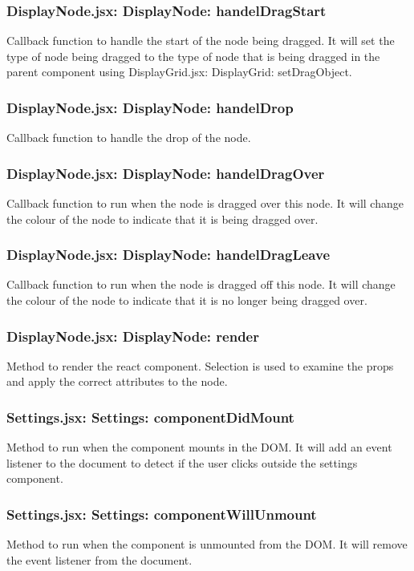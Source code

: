 \documentclass[titlepage]{article}
\begin{document}
\subsubsection{DisplayNode.jsx: DisplayNode: handelDragStart}
Callback function to handle the start of the node being dragged. It will set the type of node being dragged to the type of node that is being dragged in the parent component using DisplayGrid.jsx: DisplayGrid: setDragObject.

\subsubsection{DisplayNode.jsx: DisplayNode: handelDrop}
Callback function to handle the drop of the node.

\subsubsection{DisplayNode.jsx: DisplayNode: handelDragOver}
Callback function to run when the node is dragged over this node. It will change the colour of the node to indicate that it is being dragged over.

\subsubsection{DisplayNode.jsx: DisplayNode: handelDragLeave}
Callback function to run when the node is dragged off this node. It will change the colour of the node to indicate that it is no longer being dragged over.

\subsubsection{DisplayNode.jsx: DisplayNode: render}
Method to render the react component. Selection is used to examine the props and apply the correct attributes to the node.

\subsubsection{Settings.jsx: Settings: componentDidMount}
Method to run when the component mounts in the DOM. It will add an event listener to the document to detect if the user clicks outside the settings component.

\subsubsection{Settings.jsx: Settings: componentWillUnmount}
Method to run when the component is unmounted from the DOM. It will remove the event listener from the document.
\end{document}

